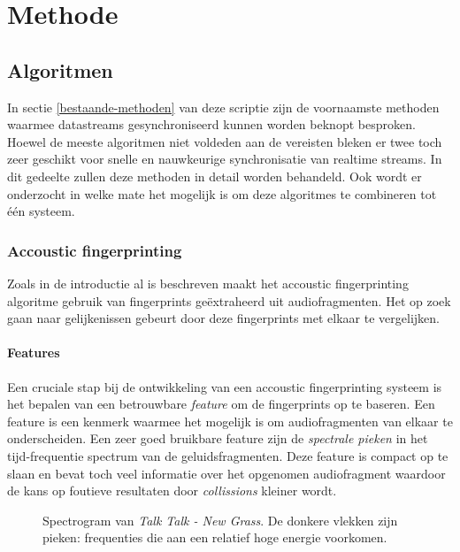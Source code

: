 \chapter{Methode}

\section{Algoritmen}

In sectie \ref{bestaande-methoden} van deze scriptie zijn de voornaamste methoden waarmee datastreams gesynchroniseerd kunnen worden beknopt besproken. Hoewel de meeste algoritmen niet voldeden aan de vereisten bleken er twee toch zeer geschikt voor snelle en nauwkeurige synchronisatie van realtime streams. In dit gedeelte zullen deze methoden in detail worden behandeld. Ook wordt er onderzocht in welke mate het mogelijk is om deze algoritmes te combineren tot één systeem.

\subsection{Accoustic fingerprinting}
\label{accoustic-fingerprinting}

Zoals in de introductie al is beschreven maakt het accoustic fingerprinting algoritme gebruik van fingerprints geëxtraheerd uit audiofragmenten. Het op zoek gaan naar gelijkenissen gebeurt door deze fingerprints met elkaar te vergelijken. 

\subsubsection{Features}

Een cruciale stap bij de ontwikkeling van een accoustic fingerprinting systeem is het bepalen van een betrouwbare \textit{feature} om de fingerprints op te baseren. Een feature is een kenmerk waarmee het mogelijk is om audiofragmenten van elkaar te onderscheiden. Een zeer goed bruikbare feature zijn de \textit{spectrale pieken} in het tijd-frequentie spectrum van de geluidsfragmenten. Deze feature is compact op te slaan en bevat toch veel informatie over het opgenomen audiofragment waardoor de kans op foutieve resultaten door \textit{collissions} kleiner wordt.

\begin{figure}[h!]
	\captionsetup{width=0.7\textwidth}
	\caption[Voorbeeld van een spectrogram]{Spectrogram van \textit{Talk Talk - New Grass}. De donkere vlekken zijn pieken: frequenties die aan een relatief hoge energie voorkomen.}
	\begin{center}
		\advance\parskip0.3cm
		
	\end{center}
\end{figure}

